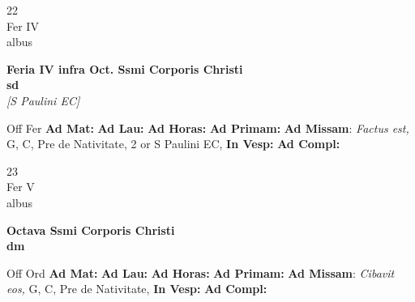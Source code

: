 \documentclass[10pt, openany]{book}
\begin{document}
    \begin{center}
        \begin{minipage}{3.5in}
            \vspace{2em}
            \begin{minipage}{0.5in}
                {\Huge 22} \\
                {\normalsize Fer IV} \\
                {\normalsize albus}
            \end{minipage}
            \begin{minipage}{3.0in}
                \textbf{ \large Feria IV infra Oct. Ssmi Corporis Christi \\
                \textnormal{\normalsize sd}} \\ \textit{[S Paulini EC]} \\ 
            \end{minipage}
            \begin{justify}Off Fer
                \textbf{Ad Mat: }
                \textbf{Ad Lau: }
                \textbf{Ad Horas: }
                \textbf{Ad Primam: }\textbf{Ad Missam}: \textit{Factus est,} G, C, Pre de Nativitate, 2 or S Paulini EC,  
                \textbf{In Vesp: }
                \textbf{Ad Compl: }
            \end{justify}
        \end{minipage}
    \end{center}

    \begin{center}
        \begin{minipage}{3.5in}
            \vspace{2em}
            \begin{minipage}{0.5in}
                {\Huge 23} \\
                {\normalsize Fer V} \\
                {\normalsize albus}
            \end{minipage}
            \begin{minipage}{3.0in}
                \textbf{ \large Octava Ssmi Corporis Christi \\
                \textnormal{\normalsize dm}} \\ 
            \end{minipage}
            \begin{justify}Off Ord
                \textbf{Ad Mat: }
                \textbf{Ad Lau: }
                \textbf{Ad Horas: }
                \textbf{Ad Primam: }\textbf{Ad Missam}: \textit{Cibavit eos,} G, C, Pre de Nativitate,  
                \textbf{In Vesp: }
                \textbf{Ad Compl: }
            \end{justify}
        \end{minipage}
    \end{center}
\end{document}
